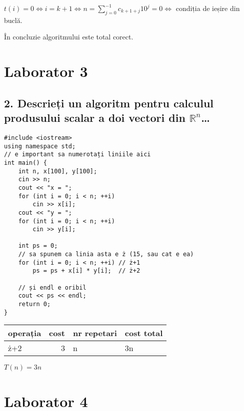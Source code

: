 \documentclass[11pt]{article}
\begin{document}
$t(i) = 0 \iff i = k + 1 \iff n = \sum\limits_{j=0}^{-1}c_{k+1+j}10^{j} = 0\iff$ condiția de ieșire din buclă.

În concluzie algoritmului este total corect.

\pagebreak
\section*{Laborator 3}
\label{sec:org83fff05}
\subsection*{2. Descrieți un algoritm pentru calculul produsului scalar a doi vectori din \(\mathbb{R}^n\)\ldots{}}
\label{sec:org6ae562a}

\begin{verbatim}
#include <iostream>
using namespace std;
// e important sa numerotați liniile aici
int main() {
    int n, x[100], y[100];
    cin >> n;
    cout << "x = ";
    for (int i = 0; i < n; ++i)
        cin >> x[i];
    cout << "y = ";
    for (int i = 0; i < n; ++i)
        cin >> y[i];

    int ps = 0;
    // sa spunem ca linia asta e ż (15, sau cat e ea)
    for (int i = 0; i < n; ++i) // ż+1
        ps = ps + x[i] * y[i];  // ż+2

    // și endl e oribil
    cout << ps << endl;
    return 0;
}
\end{verbatim}
\begin{center}
\begin{tabular}{lrll}
operația & cost & nr repetari & cost total\\
\hline
ż+2 & 3 & n & 3n\\
\end{tabular}
\end{center}

\(T(n) = 3n\)

\pagebreak
\section*{Laborator 4}
\label{sec:org8735eb4}
\end{document}
